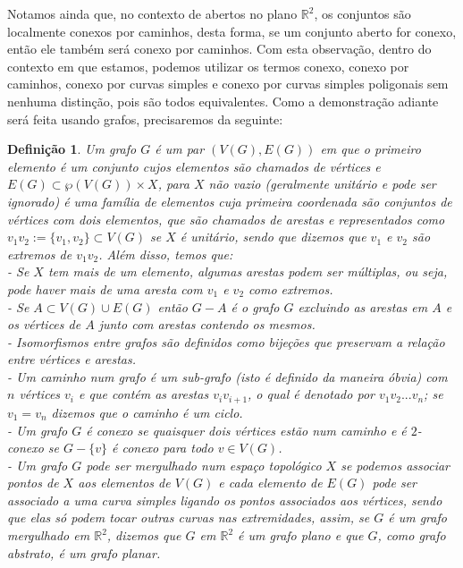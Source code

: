 \documentclass[12pt,a4paper]{article}
\newtheorem{mydef}{Definição}[section]
\theoremstyle{definition}
\begin{document}
Notamos ainda que, no contexto de abertos no plano $\mathbb{R}^2$, os conjuntos são localmente conexos por caminhos, desta forma, se um conjunto aberto for conexo, então ele também será conexo por caminhos. Com esta observação, dentro do contexto em que estamos, podemos utilizar os termos conexo, conexo por caminhos, conexo por curvas simples e conexo por curvas simples poligonais sem nenhuma distinção, pois são todos equivalentes.
Como a demonstração adiante será feita usando grafos, precisaremos da seguinte: 


\begin{mydef}

    Um grafo $G$ é um par $(V(G),E(G))$ em que o primeiro elemento é um conjunto cujos elementos são chamados de vértices e $E(G)\subset \wp(V(G))\times X$, para $X$ não vazio (geralmente unitário e pode ser ignorado) é uma família de elementos cuja primeira coordenada são conjuntos de vértices com dois elementos, que são chamados de arestas e representados como $v_1v_2 := \{v_1,v_2\}\subset V(G)$ se $X$ é unitário, sendo que dizemos que $v_1$ e $v_2$ são extremos de $v_1v_2$. Além disso, temos que: \\
    
    - Se $X$ tem mais de um elemento, algumas arestas podem ser múltiplas, ou seja, pode haver mais de uma aresta com $v_1$ e $v_2$ como extremos. \\
    
    - Se $A\subset V(G)\cup E(G)$ então $G-A$ é o grafo $G$ excluindo as arestas em $A$ e os vértices de $A$ junto com arestas contendo os mesmos. \\
    
    - Isomorfismos entre grafos são definidos como bijeções que preservam a relação entre vértices e arestas. \\
    
    - Um caminho num grafo é um sub-grafo (isto é definido da maneira óbvia) com $n$ vértices $v_i$ e que contém as arestas $v_iv_{i+1}$, o qual é denotado por $v_1v_2...v_n$; se $v_1=v_n$ dizemos que o caminho é um ciclo. \\
    
    - Um grafo $G$ é conexo se quaisquer dois vértices estão num caminho e é $2$-conexo se $G-\{v\}$ é conexo para todo $v\in V(G)$. \\
    
    - Um grafo $G$ pode ser mergulhado num espaço topológico $X$ se podemos associar pontos de $X$ aos elementos de $V(G)$ e cada elemento de $E(G)$ pode ser associado a uma curva simples ligando os pontos associados aos vértices, sendo que elas só podem tocar outras curvas nas extremidades, assim, se $G$ é um grafo mergulhado em $\mathbb{R}^2$, dizemos que $G$ em $\mathbb{R}^2$ é um grafo plano e que $G$, como grafo abstrato, é um grafo planar.
    
\end{mydef}
\end{document}
